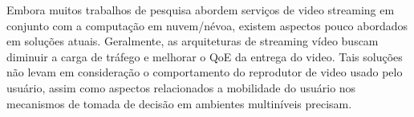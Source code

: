 Embora muitos trabalhos de pesquisa abordem serviços de video streaming em conjunto com a computação em nuvem/névoa, existem aspectos pouco abordados em soluções atuais. Geralmente, as arquiteturas de streaming vídeo buscam diminuir a carga de tráfego e melhorar o QoE da entrega do video.
Tais soluções não levam em consideração o comportamento do reprodutor de video usado pelo usuário, assim como aspectos relacionados a mobilidade do usuário nos mecanismos de tomada de decisão em ambientes multiníveis precisam. 





